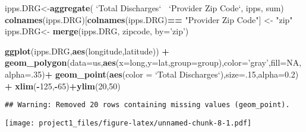 \documentclass[]{article}
\newenvironment{Shaded}{\begin{snugshade}}{\end{snugshade}}
\newcommand{\KeywordTok}[1]{\textcolor[rgb]{0.13,0.29,0.53}{\textbf{#1}}}
\newcommand{\DataTypeTok}[1]{\textcolor[rgb]{0.13,0.29,0.53}{#1}}
\newcommand{\DecValTok}[1]{\textcolor[rgb]{0.00,0.00,0.81}{#1}}
\newcommand{\FloatTok}[1]{\textcolor[rgb]{0.00,0.00,0.81}{#1}}
\newcommand{\StringTok}[1]{\textcolor[rgb]{0.31,0.60,0.02}{#1}}
\newcommand{\OtherTok}[1]{\textcolor[rgb]{0.56,0.35,0.01}{#1}}
\newcommand{\OperatorTok}[1]{\textcolor[rgb]{0.81,0.36,0.00}{\textbf{#1}}}
\newcommand{\NormalTok}[1]{#1}
\begin{document}
\begin{Shaded}
\begin{Highlighting}[]
\NormalTok{ipps.DRG<-}\KeywordTok{aggregate}\NormalTok{( }\StringTok{`}\DataTypeTok{Total Discharges}\StringTok{`}\OperatorTok{~}\StringTok{ `}\DataTypeTok{Provider Zip Code}\StringTok{`}\NormalTok{, ipps, sum)}
\KeywordTok{colnames}\NormalTok{(ipps.DRG)[}\KeywordTok{colnames}\NormalTok{(ipps.DRG)}\OperatorTok{==}\StringTok{ "Provider Zip Code"}\NormalTok{] <-}\StringTok{ "zip"}
\NormalTok{ipps.DRG<-}\StringTok{ }\KeywordTok{merge}\NormalTok{(ipps.DRG, zipcode, }\DataTypeTok{by=}\StringTok{'zip'}\NormalTok{)}
\end{Highlighting}
\end{Shaded}

\begin{Shaded}
\begin{Highlighting}[]
\KeywordTok{ggplot}\NormalTok{(ipps.DRG,}\KeywordTok{aes}\NormalTok{(longitude,latitude)) }\OperatorTok{+}
\StringTok{  }\KeywordTok{geom_polygon}\NormalTok{(}\DataTypeTok{data=}\NormalTok{us,}\KeywordTok{aes}\NormalTok{(}\DataTypeTok{x=}\NormalTok{long,}\DataTypeTok{y=}\NormalTok{lat,}\DataTypeTok{group=}\NormalTok{group),}\DataTypeTok{color=}\StringTok{'gray'}\NormalTok{,}\DataTypeTok{fill=}\OtherTok{NA}\NormalTok{,}\DataTypeTok{alpha=}\NormalTok{.}\DecValTok{35}\NormalTok{)}\OperatorTok{+}
\StringTok{  }\KeywordTok{geom_point}\NormalTok{(}\KeywordTok{aes}\NormalTok{(}\DataTypeTok{color =} \StringTok{`}\DataTypeTok{Total Discharges}\StringTok{`}\NormalTok{),}\DataTypeTok{size=}\NormalTok{.}\DecValTok{15}\NormalTok{,}\DataTypeTok{alpha=}\FloatTok{0.2}\NormalTok{) }\OperatorTok{+}
\StringTok{  }\KeywordTok{xlim}\NormalTok{(}\OperatorTok{-}\DecValTok{125}\NormalTok{,}\OperatorTok{-}\DecValTok{65}\NormalTok{)}\OperatorTok{+}\KeywordTok{ylim}\NormalTok{(}\DecValTok{20}\NormalTok{,}\DecValTok{50}\NormalTok{)}
\end{Highlighting}
\end{Shaded}

\begin{verbatim}
## Warning: Removed 20 rows containing missing values (geom_point).
\end{verbatim}

\texttt{[image: project1\_files/figure-latex/unnamed-chunk-8-1.pdf]}
\end{document}
